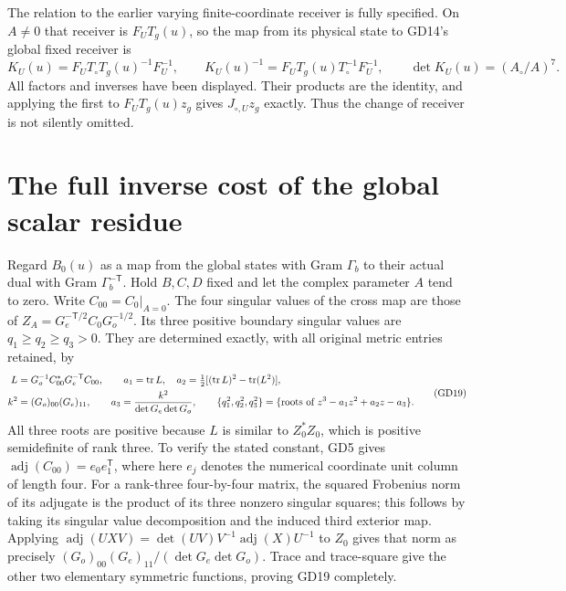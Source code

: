 \documentclass[11pt]{article}
\begin{document}
The relation to the earlier varying finite-coordinate
receiver is fully specified. On $A\ne0$ that receiver
is $F_UT_g(u)$, so the map from its physical state to
GD14's global fixed receiver is
\begin{equation}
 K_U(u)=F_UT_\circ T_g(u)^{-1}F_U^{-1},\qquad
 K_U(u)^{-1}=F_UT_g(u)T_\circ^{-1}F_U^{-1},\qquad
 \det K_U(u)=(A_\circ/A)^7.
 \tag{GD18}
\end{equation}
All factors and inverses have been displayed. Their
products are the identity, and applying the first to
$F_UT_g(u)z_g$ gives $J_{\circ,U}z_g$ exactly.
Thus the change of receiver is not silently omitted.

\section{The full inverse cost of the global scalar residue}
Regard $B_0(u)$ as a map from the global states with
Gram $\Gamma_b$ to their actual dual with Gram
$\Gamma_b^{-\mathsf T}$. Hold $B,C,D$ fixed and let
the complex parameter $A$ tend to zero. Write $C_{00}=C_0|_{A=0}$.
The four singular values of the cross map are those of
$Z_A=G_e^{-\mathsf T/2}C_0G_o^{-1/2}$. Its three
positive boundary singular values are $q_1\ge q_2\ge q_3>0$.
They are determined exactly, with all original metric
entries retained, by
\begin{equation}
\begin{aligned}
 L&=G_o^{-1}C_{00}^*G_e^{-\mathsf T}C_{00},\qquad
 a_1=\operatorname{tr}L,\quad
 a_2=\tfrac12[(\operatorname{tr}L)^2-\operatorname{tr}(L^2)],\\
 k^2&=(G_o)_{00}(G_e)_{11},\qquad
 a_3=\frac{k^2}{\det G_e\det G_o},\qquad
 \{q_1^2,q_2^2,q_3^2\}
   =\{\hbox{roots of }z^3-a_1z^2+a_2z-a_3\}.
\end{aligned}\tag{GD19}
\end{equation}
All three roots are positive because $L$ is similar to
$Z_0^*Z_0$, which is positive semidefinite of rank three.
To verify the stated constant, GD5 gives
$\operatorname{adj}(C_{00})=e_0e_1^{\mathsf T}$,
where here $e_j$ denotes the numerical coordinate unit
column of length four. For a rank-three four-by-four
matrix, the squared Frobenius norm of its adjugate is
the product of its three nonzero singular squares;
this follows by taking its singular value decomposition
and the induced third exterior map. Applying
$\operatorname{adj}(UXV)=\det(UV)V^{-1}\operatorname{adj}(X)U^{-1}$
to $Z_0$ gives that norm as precisely
$(G_o)_{00}(G_e)_{11}/(\det G_e\det G_o)$.
Trace and trace-square give the other two elementary
symmetric functions, proving GD19 completely.
\end{document}

